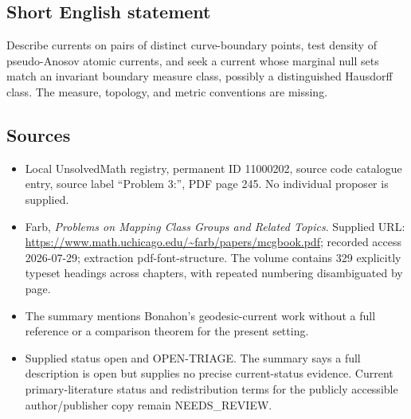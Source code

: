 \documentclass[11pt]{article}
\begin{document}
\subsection{Short English statement}
Describe currents on pairs of distinct curve-boundary points, test density of pseudo-Anosov atomic currents, and seek a current whose marginal null sets match an invariant boundary measure class, possibly a distinguished Hausdorff class. The measure, topology, and metric conventions are missing.
\subsection{Sources}
\begin{itemize}
\item Local UnsolvedMath registry, permanent ID 11000202, source code catalogue entry, source label ``Problem 3:'', PDF page 245. No individual proposer is supplied.
\item Farb, \emph{Problems on Mapping Class Groups and Related Topics}. Supplied URL: \url{https://www.math.uchicago.edu/~farb/papers/mcgbook.pdf}; recorded access 2026-07-29; extraction pdf-font-structure. The volume contains 329 explicitly typeset headings across chapters, with repeated numbering disambiguated by page.
\item The summary mentions Bonahon's geodesic-current work without a full reference or a comparison theorem for the present setting.
\item Supplied status open and OPEN-TRIAGE. The summary says a full description is open but supplies no precise current-status evidence. Current primary-literature status and redistribution terms for the publicly accessible author/publisher copy remain NEEDS\_REVIEW.
\end{itemize}
\end{document}
